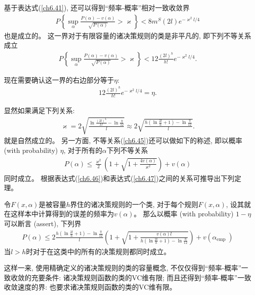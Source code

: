 基于表达式(\ref{ch6.41}), 还可以得到“频率-概率”相对一致收敛界
\begin{align}
P\left\{\sup _{\alpha} \frac{P(\alpha)-v(\alpha)}{\sqrt{P(\alpha)}}>\varkappa\right\}<8 m^{S}(2 l) e^{-\varkappa^{2} l / 4}
\end{align}
也是成立的。 这一界对于有限容量的诸决策规则的类是非平凡的, 即下列不等关系成立
\begin{align}\label{ch6.45}
P\left\{\sup _{\alpha} \frac{P(\alpha)-v(\alpha)}{\sqrt{P(\alpha)}}>\varkappa\right\}<12 \frac{(2 l)^{h}}{h !} e^{-\varkappa^{2} l / 4}.
\end{align}

现在需要确认这一界的右边部分等于$\eta$:
\begin{align}
12 \frac{(2 l)^{h}}{h !} e^{-\varkappa^{2} l / 4}=\eta.
\end{align}

显然如果满足下列关系:
\begin{align}\label{ch6.46}
\varkappa=2 \sqrt{\frac{\ln \frac{(2 l)^{h}}{h !}-\ln \frac{\eta}{12}}{l}} \approx 2 \sqrt{\frac{h\left(\ln \frac{2 l}{h}+1\right)-\ln \frac{\eta}{12}}{l}}.
\end{align}
就是自然成立的。 另一方面, 不等关系(\ref{ch6.45})还可以做如下的称述, 即以概率 (with probability) $\eta$, 对于所有的$\alpha$下列不等关系
\begin{align}\label{ch6.47}
P(\alpha) \leq \frac{\varkappa^{2}}{2}\left(1+\sqrt{1+\frac{4 v(\alpha)}{\varkappa^{2}}}\right)+v(\alpha)
\end{align}
同时成立。 根据表达式(\ref{ch6.46})和表达式(\ref{ch6.47})之间的关系可推导出下列定理。

\begin{theorem}\label{Theorem6.8}\citep{vapnik1998}
令$F(x, \alpha)$是被容量$h$界住的诸决策规则的一个类, 对于每个规则$F(x,\alpha)$, 设其就在这样本中计算得到的误差的频率为$v(\alpha)$。 那么以概率 (with probability) $1-\eta$可以断言 (assert), 下列界
\begin{align}\label{ch6.48}
P(\alpha) \leq 2 \frac{h\left(\ln \frac{2 l}{h}+1\right)-\ln \frac{\eta}{12}}{l}\left(1+\sqrt{1+\frac{v(\alpha) l}{h\left(\ln \frac{2 l}{h}+1\right)-\ln \frac{\eta}{12}}}\right)+v\left(\alpha_{\text {emp }}\right)
\end{align}
当$l>h$时对于在这类中的所有的决策规则都同时成立。
\end{theorem}

这样一来, 使用精确定义的诸决策规则的类的容量概念, 不仅仅得到“频率-概率”一致收敛的充要条件: 诸决策规则函数的类的VC维有限; 而且还得到“频率-概率”一致收敛速度的界: 也要求诸决策规则函数的类的VC维有限。

